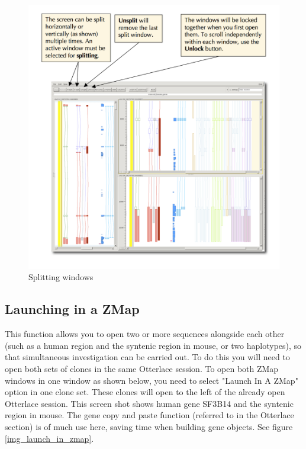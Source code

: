 \documentclass[letterpaper]{article}
\begin{document}
\begin{figure}
\centering
\color[rgb]{0.30980393,0.5058824,0.7411765}
\includegraphics[width=15.231cm]{img_split_window.png}
\caption{Splitting windows}
\label{img_split_window}
\end{figure}

\subsection{Launching in a ZMap}
This function allows you to open two or more sequences alongside each other (such as a human region and the syntenic region in mouse, or two haplotypes), so that simultaneous investigation can be carried out. To do this you will need to open both sets of clones in the same Otterlace session. To open both ZMap windows in one window as shown below, you need to select "Launch In A ZMap" option in one clone set. These clones will open to the left of the already open Otterlace session. This screen shot shows human gene SF3B14 and the syntenic region in mouse. The gene copy and paste function (referred to in the Otterlace section) is of much use here, saving time when building gene objects. See figure \ref{img_launch_in_zmap}.
\end{document}
